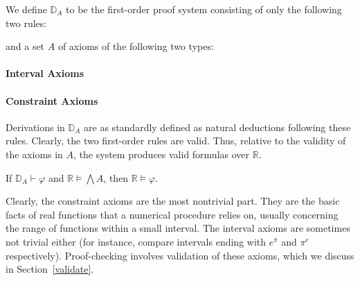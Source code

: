 \documentclass[envcountsect]{llncs}
\begin{document}
\begin{definition}
We define $\mathbb{D}_A$ to be the first-order proof system consisting of only the
following two rules:
and a set $A$ of axioms of the following two types:
\paragraph{Interval Axioms}
\begin{mathpar}
\end{mathpar}
\paragraph{Constraint Axioms}
\begin{mathpar}
\end{mathpar}
\end{definition}
Derivations in $\mathbb{D}_A$ are as standardly defined as natural deductions
following these rules. Clearly, the two first-order rules are valid. Thus,
relative to the validity of the axioms in $A$, the system produces valid
formulas over $\mathbb{R}$.
\begin{proposition}[Soundness] If $\mathbb{D}_A\vdash \varphi$ and
$\mathbb{R}\models \bigwedge A$, then $\mathbb{R}\models \varphi$.
\end{proposition}
\begin{remark}
 Clearly, the constraint axioms are the most nontrivial part. They are the
basic facts of real functions that a numerical procedure relies on, usually
concerning the range of functions within a small interval. The interval axioms
are sometimes not trivial either (for instance, compare intervals ending with 
$e^{\pi}$ and $\pi^e$ respectively).  Proof-checking involves validation of
these axioms, which we discuss in Section~\ref{validate}. 
\end{remark}
\end{document}
